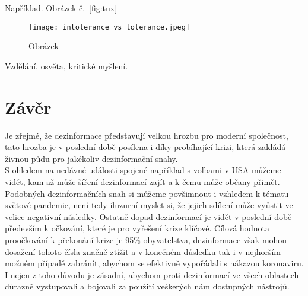 Například. Obrázek č.~\ref{fig:tux}

\begin{figure}[htbp]
  \centering
  \texttt{[image: intolerance\_vs\_tolerance.jpeg]}
  \caption{Obrázek}
  \label{fig:google trends}
\end{figure}

Vzdělání, osvěta, kritické myšlení.

\newpage

\section{Závěr}

Je zřejmé, že dezinformace představují velkou hrozbu pro moderní společnost, tato hrozba je v poslední době posílena i díky probíhající krizi, která zakládá živnou půdu pro jakékoliv dezinformační snahy.\\

S ohledem na nedávné události spojené například s volbami v USA můžeme vidět, kam až může šíření dezinformací zajít a k čemu může občany přimět.\\

Podobných dezinformačních snah si můžeme povšimnout i vzhledem k tématu světové pandemie, není tedy iluzurní myslet si, že jejich sdílení může vyůstit ve velice negativní následky. Ostatně dopad dezinformací je vidět v poslední době především k očkování, které je pro vyřešení krize klíčové. Cílová hodnota proočkování k překonání krize je 95\% obyvatelstva, dezinformace však mohou dosažení tohoto čísla značně ztížit a v konečném důsledku tak i v nejhorším možném případě zabránít, abychom se efektivně vypořádali s nákazou koronaviru. I nejen z toho důvodu je zásadní, abychom proti dezinformací ve všech oblastech důrazně vystupovali a bojovali za použití veškerých nám dostupných nástrojů.

